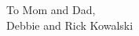 \begin{dedication}
\null\vfil
{\large
\begin{center}
To Mom and Dad,\\\vspace{12pt}
Debbie and Rick Kowalski\\\vspace{12pt}
\end{center}}
\vfil\null
\end{dedication}
